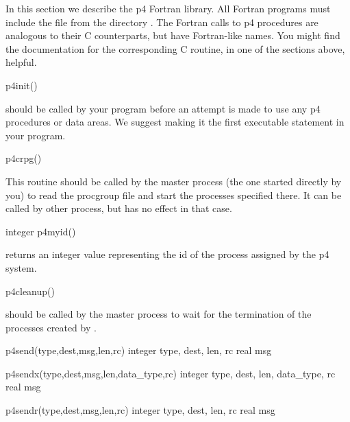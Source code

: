 In this section we describe the p4 Fortran library.  All Fortran programs must
include the file  from the directory .  The Fortran
calls to p4 procedures are analogous to their C counterparts, but have
Fortran-like names.  You might find the documentation for the corresponding C
routine, in one of the sections above, helpful.

\begin{example}
p4init()
\end{example}
\noindent
should be called by your program before an attempt is made to use
any p4 procedures or data areas.  We suggest making it the first executable
statement in your program.

\begin{example}
p4crpg()
\end{example}
\noindent
This routine should be called by the master process (the one started directly
by you) to read the procgroup file and start the processes specified there.
It can be called by other process, but has no effect in that case.

\begin{example}
integer p4myid()
\end{example}
\noindent
returns an integer value representing the id of the process assigned by
the p4 system.

\begin{example}
p4cleanup()
\end{example}
\noindent
should be called by the master process to wait for the termination of the
processes created by .

\begin{example}
p4send(type,dest,msg,len,rc)
integer type, dest, len, rc
real msg
\end{example}
\noindent

\begin{example}
p4sendx(type,dest,msg,len,data_type,rc)
integer type, dest, len, data_type, rc
real msg
\end{example}
\noindent

\begin{example}
p4sendr(type,dest,msg,len,rc)
integer type, dest, len, rc
real msg
\end{example}
\noindent

